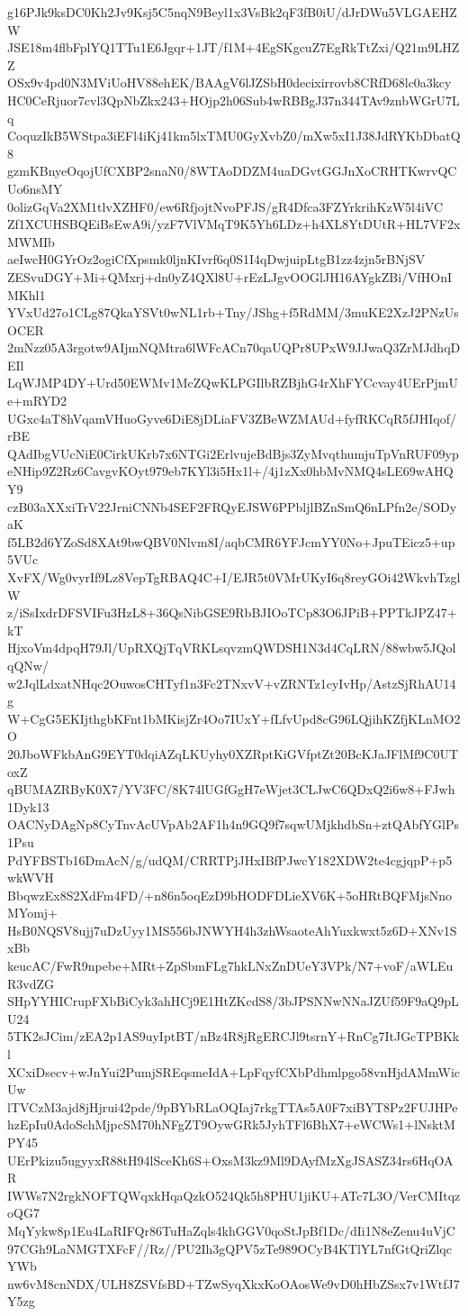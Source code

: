 g16PJk9ksDC0Kh2Jv9Ksj5C5nqN9Beyl1x3VsBk2qF3fB0iU/dJrDWu5VLGAEHZW
JSE18m4flbFplYQ1TTu1E6Jgqr+1JT/f1M+4EgSKgcuZ7EgRkTtZxi/Q21m9LHZZ
OSx9v4pd0N3MViUoHV88ehEK/BAAgV6lJZSbH0decixirrovb8CRfD68lc0a3kcy
HC0CeRjuor7cvl3QpNbZkx243+HOjp2h06Sub4wRBBgJ37n344TAv9znbWGrU7Lq
CoquzIkB5WStpa3iEFl4iKj41km5lxTMU0GyXvbZ0/mXw5xI1J38JdRYKbDbatQ8
gzmKBnyeOqojUfCXBP2snaN0/8WTAoDDZM4uaDGvtGGJnXoCRHTKwrvQCUo6nsMY
0olizGqVa2XM1tlvXZHF0/ew6RfjojtNvoPFJS/gR4Dfca3FZYrkrihKzW5l4iVC
Zf1XCUHSBQEiBsEwA9i/yzF7VlVMqT9K5Yh6LDz+h4XL8YtDUtR+HL7VF2xMWMIb
aeIwcH0GYrOz2ogiCfXpsmk0ljnKIvrf6q0S1I4qDwjuipLtgB1zz4zjn5rBNjSV
ZESvuDGY+Mi+QMxrj+dn0yZ4QXl8U+rEzLJgvOOGlJH16AYgkZBi/VfHOnIMKhl1
YVxUd27o1CLg87QkaYSVt0wNL1rb+Tny/JShg+f5RdMM/3muKE2XzJ2PNzUsOCER
2mNzz05A3rgotw9AIjmNQMtra6lWFcACn70qaUQPr8UPxW9JJwaQ3ZrMJdhqDEIl
LqWJMP4DY+Urd50EWMv1McZQwKLPGIlbRZBjhG4rXhFYCcvay4UErPjmUe+mRYD2
UGxc4aT8hVqamVHuoGyve6DiE8jDLiaFV3ZBeWZMAUd+fyfRKCqR5fJHIqof/rBE
QAdIbgVUcNiE0CirkUKrb7x6NTGi2ErlvujeBdBjs3ZyMvqthumjuTpVnRUF09yp
eNHip9Z2Rz6CavgvKOyt979eb7KYl3i5Hx1l+/4j1zXx0hbMvNMQ4sLE69wAHQY9
czB03aXXxiTrV22JrniCNNb4SEF2FRQyEJSW6PPbljlBZnSmQ6nLPfn2e/SODyaK
f5LB2d6YZoSd8XAt9bwQBV0Nlvm8I/aqbCMR6YFJcmYY0No+JpuTEicz5+up5VUc
XvFX/Wg0vyrIf9Lz8VepTgRBAQ4C+I/EJR5t0VMrUKyI6q8reyGOi42WkvhTzglW
z/iSsIxdrDFSVIFu3HzL8+36QsNibGSE9RbBJIOoTCp83O6JPiB+PPTkJPZ47+kT
HjxoVm4dpqH79Jl/UpRXQjTqVRKLsqvzmQWDSH1N3d4CqLRN/88wbw5JQolqQNw/
w2JqlLdxatNHqc2OuwosCHTyf1n3Fc2TNxvV+vZRNTz1cyIvHp/AstzSjRhAU14g
W+CgG5EKIjthgbKFnt1bMKisjZr4Oo7IUxY+fLfvUpd8cG96LQjihKZfjKLnMO2O
20JboWFkbAnG9EYT0dqiAZqLKUyhy0XZRptKiGVfptZt20BcKJaJFlMf9C0UToxZ
qBUMAZRByK0X7/YV3FC/8K74lUGfGgH7eWjet3CLJwC6QDxQ2i6w8+FJwh1Dyk13
OACNyDAgNp8CyTnvAcUVpAb2AF1h4n9GQ9f7sqwUMjkhdbSn+ztQAbfYGlPs1Psu
PdYFBSTb16DmAcN/g/udQM/CRRTPjJHxIBfPJwcY182XDW2te4cgjqpP+p5wkWVH
BbqwzEx8S2XdFm4FD/+n86n5oqEzD9bHODFDLieXV6K+5oHRtBQFMjsNnoMYomj+
HsB0NQSV8ujj7uDzUyy1MS556bJNWYH4h3zhWsaoteAhYuxkwxt5z6D+XNv1SxBb
keucAC/FwR9npebe+MRt+ZpSbmFLg7hkLNxZnDUeY3VPk/N7+voF/aWLEuR3vdZG
SHpYYHICrupFXbBiCyk3ahHCj9E1HtZKcdS8/3bJPSNNwNNaJZUf59F9aQ9pLU24
5TK2sJCim/zEA2p1AS9uyIptBT/nBz4R8jRgERCJl9tsrnY+RnCg7ItJGcTPBKkl
XCxiDsecv+wJnYui2PumjSREqsmeIdA+LpFqyfCXbPdhmlpgo58vnHjdAMmWicUw
lTVCzM3ajd8jHjrui42pde/9pBYbRLaOQIaj7rkgTTAs5A0F7xiBYT8Pz2FUJHPe
hzEpIu0AdoSchMjpcSM70hNFgZT9OywGRk5JyhTFl6BhX7+eWCWs1+lNsktMPY45
UErPkizu5ugyyxR88tH94lSceKh6S+OxsM3kz9Ml9DAyfMzXgJSASZ34rs6HqOAR
IWWs7N2rgkNOFTQWqxkHqaQzkO524Qk5h8PHU1jiKU+ATc7L3O/VerCMItqzoQG7
MqYykw8p1Eu4LaRIFQr86TuHaZqls4khGGV0qoStJpBf1Dc/dIi1N8eZenu4uVjC
97CGh9LaNMGTXFcF//Rz//PU2Ih3gQPV5zTe989OCyB4KTlYL7nfGtQriZlqcYWb
nw6vM8cnNDX/ULH8ZSVfsBD+TZwSyqXkxKoOAosWe9vD0hHbZSsx7v1WtfJ7Y5zg
